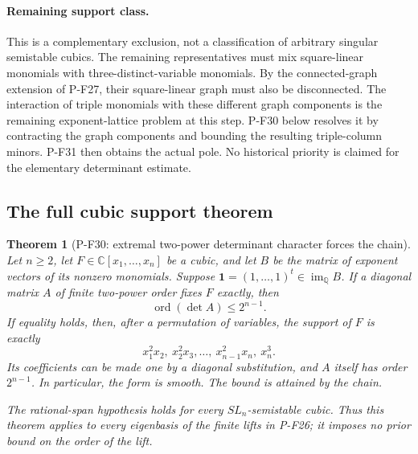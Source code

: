 \documentclass[11pt,a4paper]{article}
\newtheorem{theorem}[proposition]{Theorem}
\begin{document}
\paragraph{Remaining support class.}
This is a complementary exclusion, not a classification
of arbitrary singular semistable cubics. The remaining
representatives must mix square-linear monomials with
three-distinct-variable monomials. By the connected-graph
extension of P-F27, their square-linear graph must also
be disconnected. The interaction of triple monomials
with these different graph components is the remaining
exponent-lattice problem at this step. P-F30 below resolves it
by contracting the graph components and bounding the resulting
triple-column minors. P-F31 then obtains the actual pole.
No historical priority is
claimed for the elementary determinant estimate.


\subsection{The full cubic support theorem}

\begin{theorem}[P-F30: extremal two-power determinant character forces the chain]
\label{thm:fullcubicsupport}
Let $n\ge2$, let $F\in\mathbb C[x_1,\ldots,x_n]$ be
a cubic, and let $B$ be the matrix of exponent vectors
of its nonzero monomials. Suppose
$\mathbf1=(1,\ldots,1)^t\in\operatorname{im}_{\mathbb Q}B$.
If a diagonal matrix $A$ of finite two-power order
fixes $F$ exactly, then
\[
 \operatorname{ord}(\det A)\le2^{n-1}.
 \tag{P-F30a}
\]
If equality holds, then, after a permutation of variables,
the support of $F$ is exactly
\[
 x_1^2x_2,\ x_2^2x_3,\ldots,\ x_{n-1}^2x_n,\ x_n^3.
 \tag{P-F30b}
\]
Its coefficients can be made one by a diagonal substitution,
and $A$ itself has order $2^{n-1}$. In particular, the
form is smooth. The bound is attained by the chain.

The rational-span hypothesis holds for every
$SL_n$-semistable cubic. Thus this theorem applies
to every eigenbasis of the finite lifts in P-F26;
it imposes no prior bound on the order of the lift.
\end{theorem}
\end{document}

